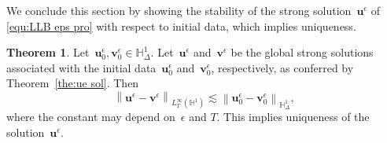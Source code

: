 \documentclass[11pt,reqno]{amsart}
\theoremstyle{definition}
\newtheorem{theorem}{Theorem}[section]
\numberwithin{equation}{section}
\newcommand{\bff}{\boldsymbol}
\newcommand{\bb}{\mathbb}
\newcommand{\ds}{\mathrm{d}s}
\newcommand{\norm}[2]{\left\|{#1}\right\|_{#2}}
\begin{document}


We conclude this section by showing the stability of the strong solution~$\bff{u}^\epsilon$ of \eqref{equ:LLB eps pro} with respect to initial data, which implies uniqueness.

\begin{theorem}\label{the:unique llbe}
	Let~$\bff{u}_0^\epsilon, \bff{v}_0^\epsilon \in \bb{H}^1_\Delta$.
	Let~$\bff{u}^\epsilon$ and~$\bff{v}^\epsilon$ be the global strong solutions
	associated with the initial data~$\bff{u}_0^\epsilon$
	and~$\bff{v}_0^\epsilon$, respectively, as conferred by
	Theorem~\ref{the:ue sol}. Then
	\[
	\norm{\bff{u}^\epsilon-\bff{v}^\epsilon}{L^\infty_T(\bb{H}^1)} 
	\lesssim
	\norm{\bff{u}_0^\epsilon-\bff{v}_0^\epsilon}{\bb{H}^1_\Delta}, 
	\]
	where the constant may depend on~$\epsilon$ and $T$. This implies
	uniqueness of the solution~$\bff{u}^\epsilon$.
\end{theorem}
\end{document}
